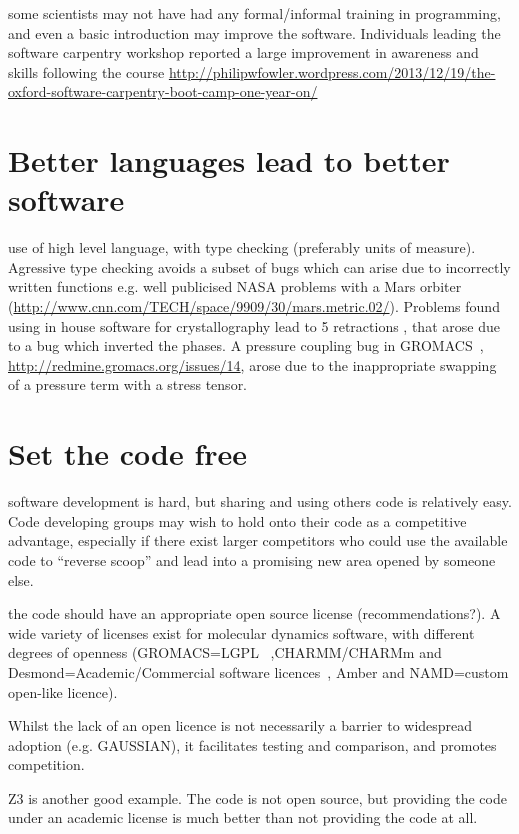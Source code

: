 \documentclass[conference]{IEEEtran}
\begin{document}
some scientists may not have had any formal/informal training in programming, and even a basic introduction may improve the software. Individuals leading the software carpentry workshop reported a large improvement in awareness and skills following the course \url{http://philipwfowler.wordpress.com/2013/12/19/the-oxford-software-carpentry-boot-camp-one-year-on/}


\section{Better languages lead to better software} 

use of high level language, with type checking (preferably units of
measure). Agressive type checking avoids a subset of bugs which can
arise due to incorrectly written functions e.g. well publicised NASA
problems with a Mars orbiter
(\url{http://www.cnn.com/TECH/space/9909/30/mars.metric.02/}). Problems
found using in house software for crystallography lead to 5
retractions \cite{Miller2006}, that arose due to a bug which inverted
the phases. A pressure coupling bug in GROMACS~\cite{Hess2008},
\url{http://redmine.gromacs.org/issues/14}, arose due to the
inappropriate swapping of a pressure term with a stress tensor.

\section{Set the code free} 

software development is hard, but sharing and using others code is
relatively easy. Code developing groups may wish to hold onto their
code as a competitive advantage, especially if there exist larger
competitors who could use the available code to ``reverse scoop'' and
lead into a promising new area opened by someone else.

the code should have an appropriate open source license
(recommendations?). A wide variety of licenses exist for molecular
dynamics software, with different degrees of openness (GROMACS=LGPL~\cite{Hess2008}
,CHARMM/CHARMm and Desmond=Academic/Commercial software licences~\cite{Brookes2009,Bowers2006}, Amber
and NAMD=custom open-like licence).

Whilst the lack of an open licence is not necessarily a barrier to
widespread adoption (e.g. GAUSSIAN), it facilitates testing and
comparison, and promotes competition.

Z3 is another good example. The code is not open source, but providing
the code under an academic license is much better than not providing
the code at all.
\end{document}

